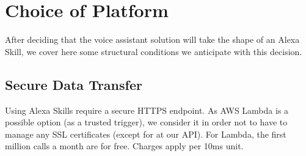 

%


%
%	
%






%
%
%
%	

\section{Choice of Platform} %
\label{choiceOfPlatform}

After deciding that the voice assistant solution will take the shape of an Alexa Skill, we cover here some structural conditions we anticipate with this decision.

	\subsection*{Secure Data Transfer}
	Using Alexa Skills require a secure HTTPS endpoint. As AWS Lambda is a possible option (as a trusted trigger), we consider it in order not to have to manage any SSL certificates (except for at our API). For Lambda, the first million calls a month are for free. Charges apply per 10ms unit.
	
